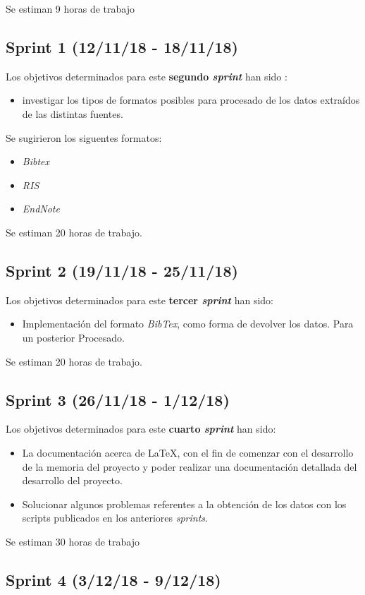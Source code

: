 Se estiman 9 horas de trabajo
\subsection{Sprint 1 (12/11/18 - 18/11/18)}
Los objetivos determinados para este \textbf{segundo \emph{sprint}} han sido : 
\begin{itemize}
\item investigar los tipos de formatos posibles para procesado de los datos extraídos de las distintas fuentes.
\end{itemize}
Se sugirieron los siguentes formatos:
\begin{itemize}
\item \emph{Bibtex}
\item \emph{RIS}
\item \emph{EndNote}
\end{itemize}
Se estiman 20 horas de trabajo.

\subsection{Sprint 2 (19/11/18 - 25/11/18)}
Los objetivos determinados para este \textbf{tercer \emph{sprint}} han sido:
\begin{itemize}
	\item Implementación del formato \emph{BibTex}, como forma de devolver los datos. Para un posterior Procesado.
\end{itemize}

Se estiman 20 horas de trabajo.

\subsection{Sprint 3 (26/11/18 - 1/12/18)}
Los objetivos determinados para este \textbf{cuarto \emph{sprint}} han sido:
\begin{itemize}
	\item La documentación acerca de \LaTeX, con el fin de comenzar con el desarrollo de la memoria del proyecto y poder 
	 realizar una documentación detallada del desarrollo del proyecto.
	 \item Solucionar algunos problemas referentes a la obtención de los datos con los scripts publicados en los anteriores \emph{sprints}.
\end{itemize}

Se estiman 30 horas de trabajo
\subsection{Sprint 4 (3/12/18 - 9/12/18)}

